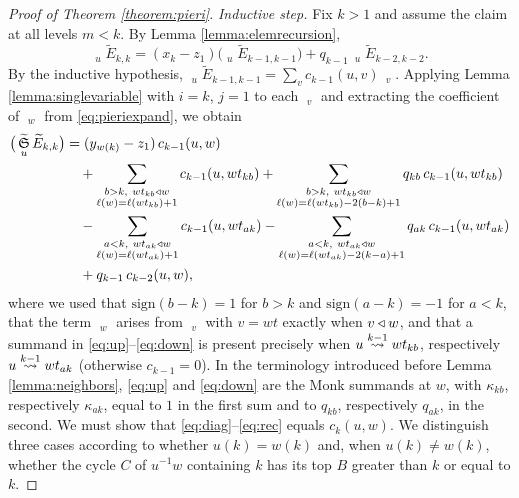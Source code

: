\documentclass{amsart}
\theoremstyle{definition}
\theoremstyle{remark}
\numberwithin{equation}{section}
\DeclareMathOperator{\qsch}{\widetilde{\mathfrak{S}}}
\newcommand{\xrightsquigarrow}[2][]{%
	\mathrel{\mathop{\rightsquigarrow}\limits^{\scriptstyle #2}%
	\ifx\hfuzz#1\hfuzz\else_{\scriptstyle #1}\fi}%
}
\newcommand{\tom}[1]{\ensuremath{\xrightsquigarrow{#1}}}
\newcommand{\qelem}{\widetilde{E}}
\begin{document}
\begin{proof}[Proof of Theorem \ref{theorem:pieri}]
\emph{Inductive step.} Fix $k>1$ and assume the claim at all levels $m<k$. By Lemma \ref{lemma:elemrecursion},
\begin{equation}\label{eq:pieriexpand}
\qsch_u\qelem_{k,k}=(x_k-z_1)\big(\qsch_u\qelem_{k-1,k-1}\big)+q_{k-1}\,\qsch_u\qelem_{k-2,k-2}.
\end{equation}
By the inductive hypothesis, $\qsch_u\qelem_{k-1,k-1}=\sum_v c_{k-1}(u,v)\,\qsch_v$. Applying Lemma \ref{lemma:singlevariable} with $i=k$, $j=1$ to each $\qsch_v$ and extracting the coefficient of $\qsch_w$ from \eqref{eq:pieriexpand}, we obtain
\begin{align}
[\qsch_w]\big(\qsch_u\qelem_{k,k}\big)
&=(y_{w(k)}-z_1)\,c_{k-1}(u,w) \label{eq:diag}\\
&\quad+\sum_{\substack{b>k,\ w t_{kb}\lup w\\ \ell(w)=\ell(wt_{kb})+1}} c_{k-1}(u,wt_{kb})
+\sum_{\substack{b>k,\ w t_{kb}\lup w\\ \ell(w)=\ell(wt_{kb})-2(b-k)+1}} q_{kb}\,c_{k-1}(u,wt_{kb}) \label{eq:up}\\
&\quad-\sum_{\substack{a<k,\ w t_{ak}\lup w\\ \ell(w)=\ell(wt_{ak})+1}} c_{k-1}(u,wt_{ak})
-\sum_{\substack{a<k,\ w t_{ak}\lup w\\ \ell(w)=\ell(wt_{ak})-2(k-a)+1}} q_{ak}\,c_{k-1}(u,wt_{ak}) \label{eq:down}\\
&\quad+q_{k-1}\,c_{k-2}(u,w), \label{eq:rec}
\end{align}
where we used that $\mathrm{sign}(b-k)=1$ for $b>k$ and $\mathrm{sign}(a-k)=-1$ for $a<k$, that the term $\qsch_w$ arises from $\qsch_v$ with $v=wt$ exactly when $v\triangleleft w$, and that a summand in \eqref{eq:up}--\eqref{eq:down} is present precisely when $u\tom{k-1}wt_{kb}$, respectively $u\tom{k-1}wt_{ak}$ (otherwise $c_{k-1}=0$). In the terminology introduced before Lemma \ref{lemma:neighbors}, \eqref{eq:up} and \eqref{eq:down} are the Monk summands at $w$, with $\kappa_{kb}$, respectively $\kappa_{ak}$, equal to $1$ in the first sum and to $q_{kb}$, respectively $q_{ak}$, in the second. We must show that \eqref{eq:diag}--\eqref{eq:rec} equals $c_k(u,w)$. We distinguish three cases according to whether $u(k)=w(k)$ and, when $u(k)\neq w(k)$, whether the cycle $C$ of $u^{-1}w$ containing $k$ has its top $B$ greater than $k$ or equal to $k$.


\end{proof}
\end{document}
